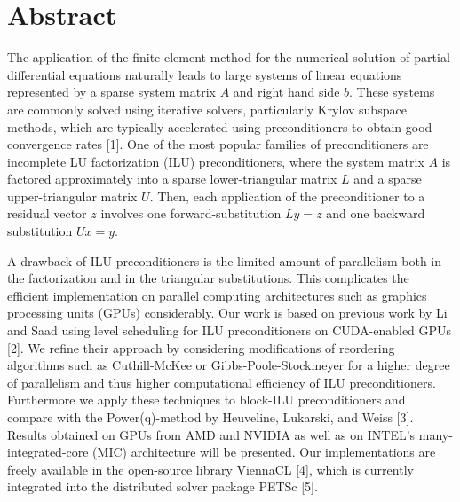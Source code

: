 \documentclass[article, A4, 11pt]{llncs}%
\begin{document}
\section*{Abstract}
The application of the finite element method for the numerical solution of partial differential equations naturally leads to large systems of linear equations represented by a sparse system matrix $A$ and right hand side $b$. These systems are commonly solved using iterative solvers, particularly Krylov subspace methods, which are typically accelerated using preconditioners to obtain good convergence rates [1]. One of the most popular families of preconditioners are incomplete LU factorization (ILU) preconditioners, where the system matrix $A$ is factored approximately into a sparse lower-triangular matrix $L$ and a sparse upper-triangular matrix $U$. Then, each application of the preconditioner to a residual vector $z$ involves one forward-substitution $Ly = z$ and one backward substitution $Ux = y$.

A drawback of ILU preconditioners is the limited amount of parallelism both in the factorization and in the triangular substitutions. This complicates the efficient implementation on parallel computing architectures such as graphics processing units (GPUs) considerably. Our work is based on previous work by Li and Saad using level scheduling for ILU preconditioners on CUDA-enabled GPUs [2]. We refine their approach by considering modifications of reordering algorithms such as Cuthill-McKee or Gibbs-Poole-Stockmeyer for a higher degree of parallelism and thus higher computational efficiency of ILU preconditioners. Furthermore we apply these techniques to block-ILU preconditioners and compare with the Power(q)-method by Heuveline, Lukarski, and Weiss [3]. Results obtained on GPUs from AMD and NVIDIA as well as on INTEL's many-integrated-core (MIC) architecture will be presented. Our implementations are freely available in the open-source library ViennaCL [4], which is currently integrated into the distributed solver package PETSc [5].
\end{document}
